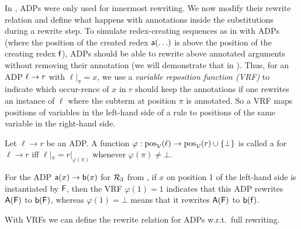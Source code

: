 In \cite{FLOPS2024},
ADPs were only used for innermost rewriting.
We now modify their rewrite relation and define what happens 
with annotations inside the substitutions during a rewrite step.
To simulate redex-creating sequences as in 
with ADPs (where the position of the created redex $\mathsf{a}(\ldots)$
is above the position of the creating redex $\mathsf{f}$),
ADPs should be able to rewrite above annotated arguments
without removing their annotation (we will demonstrate that in
).
Thus, for an ADP $\ell \to\linebreak r$ with $\ell|_\pi = x$, we use a 
\emph{variable reposition function (VRF)} to indicate which occur-\linebreak rence of $x$ in $r$ should
keep the annotations if one rewrites an instance of $\ell$ where the subterm at position
$\pi$ is annotated.
So a VRF maps  positions of variables in the left-hand side of a rule to
positions of the same variable in the right-hand side.

\begin{definition}\label{def:Var-Repos-Func}
    Let $\ell \to r$ be an ADP.
	A function $\varphi: \mathrm{pos}_{\mathcal{V}}(\ell) \to \mathrm{pos}_{\mathcal{V}}(r) \cup \{\bot\}$ is called a
     for
    $\ell \to r$
    iff
    $\ell|_\pi = r|_{\varphi(\pi)}$ whenever
 $\varphi(\pi) \neq \bot$.
\end{definition}

\begin{example}\label{example:rel-var-repos-function}
    For the ADP $\mathsf{a}(x) \to \mathsf{b}(x)$ for $\mathcal{R}_3$ from ,
    if $x$ on position 1 of the left-hand side is instantiated by $\mathsf{F}$,
    then the VRF $\varphi(1) = 1$ 
    indicates that
    this ADP rewrites $\mathsf{A}(\mathsf{F})$ to $\mathsf{b}(\mathsf{F})$, whereas
    $\varphi(1) = \bot$  means that
    it rewrites $\mathsf{A}(\mathsf{F})$ to $\mathsf{b}(\mathsf{f})$.
\end{example}

With VRFs we can define the rewrite relation for ADPs w.r.t.\ full rewriting.


